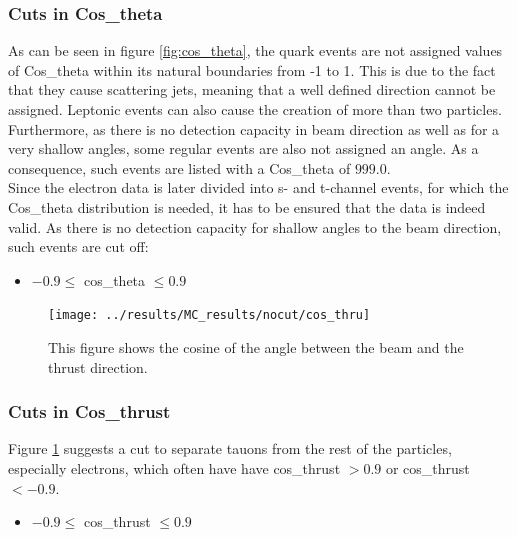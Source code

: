 \subsubsection{Cuts in Cos\_theta}
As can be seen in figure \ref{fig:cos_theta}, the quark events are not assigned values of Cos\_theta within its natural boundaries from -1 to 1. This is due to the fact that they cause scattering jets, meaning that a well defined direction cannot be assigned. Leptonic events can also cause the creation of more than two particles. Furthermore, as there is no detection capacity in beam direction as well as for a very shallow angles, some regular events are also not assigned an angle. As a consequence, such events are listed with a Cos\_theta of $999.0$.\\
Since the electron data is later divided into s- and t-channel events, for which the Cos\_theta distribution is needed, it has to be ensured that the data is indeed valid. As there is no detection capacity for shallow angles to the beam direction, such events are cut off:

\begin{itemize}
	\item{ $-0.9\le$ cos\_theta $\le0.9$}
\end{itemize}

\newpage
\begin{figure}[H]
\centering
\texttt{[image: ../results/MC\_results/nocut/cos\_thru]}
\caption[Cos\_thru in simulation data]{This figure shows the cosine of the angle between the beam and the thrust direction.}
\label{fig:cos_thru}
\end{figure}

\subsubsection{Cuts in Cos\_thrust}
Figure \ref{fig:cos_thru} suggests a cut to separate tauons from the rest of the particles, especially electrons, which often have have cos\_thrust $>0.9$ or cos\_thrust $<-0.9$.

\begin{itemize}
	\item{ $-0.9\le$ cos\_thrust $\le0.9$}
\end{itemize}

